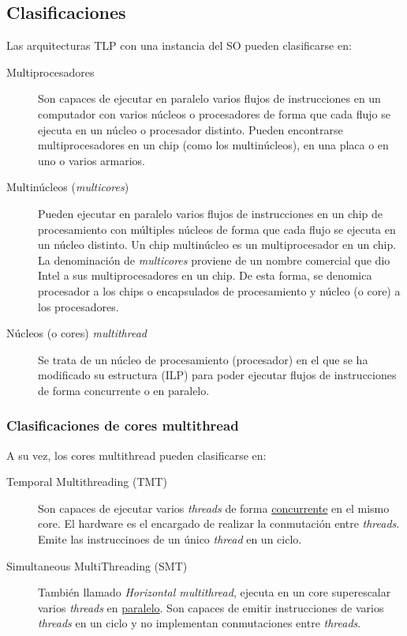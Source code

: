 \subsection{Clasificaciones}
Las arquitecturas TLP con una instancia del SO pueden clasificarse en:
\begin{description}
    \item [Multiprocesadores] Son capaces de ejecutar en paralelo varios flujos de instrucciones en un computador con varios núcleos o procesadores de forma que cada flujo se ejecuta en un núcleo o procesador distinto. Pueden encontrarse multiprocesadores en un chip (como los multinúcleos), en una placa o en uno o varios armarios.
    \item [Multinúcleos (\emph{multicores})] Pueden ejecutar en paralelo varios flujos de instrucciones en un chip de procesamiento con múltiples núcleos de forma que cada flujo se ejecuta en un núcleo distinto. Un chip multinúcleo es un multiprocesador en un chip. La denominación de \emph{multicores} proviene de un nombre comercial que dio Intel a sus multiprocesadores en un chip. De esta forma, se denomica procesador a los chips o encapsulados de procesamiento y núcleo (o core) a los procesadores.
    \item [Núcleos (o cores) \emph{multithread}] Se trata de un núcleo de procesamiento (procesador) en el que se ha modificado su estructura (ILP) para poder ejecutar flujos de instrucciones de forma concurrente o en paralelo.
\end{description}


\subsubsection{Clasificaciones de cores multithread}
A su vez, los cores multithread pueden clasificarse en:
\begin{description}
    \item [Temporal Multithreading (TMT)] Son capaces de ejecutar varios \emph{threads} de forma \underline{concurrente} en el mismo core. El hardware es el encargado de realizar la conmutación entre \emph{threads}. Emite las instruccinoes de un único \emph{thread} en un ciclo.
    \item [Simultaneous MultiThreading (SMT)] También llamado \emph{Horizontal multithread}, ejecuta en un core superescalar varios \emph{threads} en \underline{paralelo}. Son capaces de emitir instrucciones de varios \emph{threads} en un ciclo y no implementan conmutaciones entre \emph{threads}.
\end{description}

